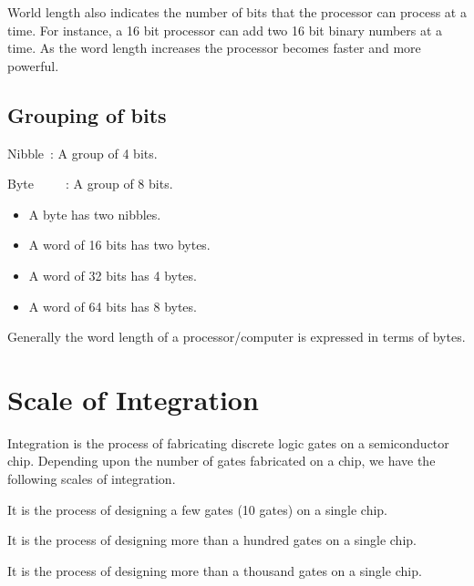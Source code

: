 World length also indicates the number of bits that the processor can process at a time. For instance, a 16 bit processor can add two 16 bit binary numbers at a time. As the word length increases the processor becomes faster and more powerful.

\eject

\subsection{Grouping of bits}

Nibble~: A group of 4 bits.

\noindent
Byte~~~~~\!: A group of 8 bits.
\begin{itemize}
\itemsep=0pt
\item A byte has two nibbles.

\item A word of 16 bits has two bytes.

\item A word of 32 bits has 4 bytes.

\item A word of 64 bits has 8 bytes.
\end{itemize}
Generally the word length of a processor/computer is expressed in terms of bytes.

\section{Scale of Integration}\label{sec7.2}

Integration is the process of fabricating discrete logic gates on a semiconductor chip. Depending upon the number of gates fabricated on a chip, we have the following scales of integration.

\medskip
{}

It is the process of designing a few gates (10 gates) on a single chip.

\medskip
{}

It is the process of designing more than a hundred gates on a single chip.

\medskip
{}

It is the process of designing more than a thousand gates on a single chip.

\medskip
{}

